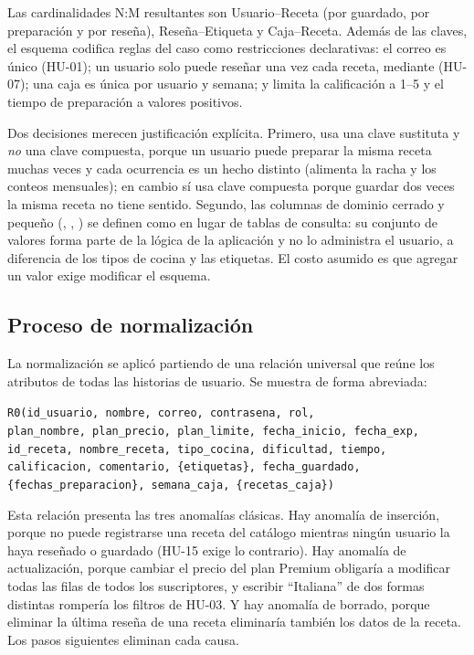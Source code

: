 Las cardinalidades N:M resultantes son Usuario--Receta (por guardado, por preparación y por reseña), Reseña--Etiqueta y Caja--Receta. Además de las claves, el esquema codifica reglas del caso como restricciones declarativas: el correo es único (HU-01); un usuario solo puede reseñar una vez cada receta, mediante  (HU-07); una caja es única por usuario y semana; y  limita la calificación a 1--5 y el tiempo de preparación a valores positivos.

Dos decisiones merecen justificación explícita. Primero,  usa una clave sustituta y \emph{no} una clave compuesta, porque un usuario puede preparar la misma receta muchas veces y cada ocurrencia es un hecho distinto (alimenta la racha y los conteos mensuales); en cambio  sí usa clave compuesta porque guardar dos veces la misma receta no tiene sentido. Segundo, las columnas de dominio cerrado y pequeño (, , ) se definen como  en lugar de tablas de consulta: su conjunto de valores forma parte de la lógica de la aplicación y no lo administra el usuario, a diferencia de los tipos de cocina y las etiquetas. El costo asumido es que agregar un valor exige modificar el esquema.

\subsection{Proceso de normalización}
La normalización se aplicó partiendo de una relación universal que reúne los atributos de todas las historias de usuario. Se muestra de forma abreviada:

\vspace{2pt}
\noindent\footnotesize\texttt{R0(id\_usuario, nombre, correo, contrasena, rol,\\
\hspace*{1.5em}plan\_nombre, plan\_precio, plan\_limite, fecha\_inicio, fecha\_exp,\\
\hspace*{1.5em}id\_receta, nombre\_receta, tipo\_cocina, dificultad, tiempo,\\
\hspace*{1.5em}calificacion, comentario, \{etiquetas\}, fecha\_guardado,\\
\hspace*{1.5em}\{fechas\_preparacion\}, semana\_caja, \{recetas\_caja\})}
\normalsize
\vspace{2pt}

Esta relación presenta las tres anomalías clásicas. Hay anomalía de inserción, porque no puede registrarse una receta del catálogo mientras ningún usuario la haya reseñado o guardado (HU-15 exige lo contrario). Hay anomalía de actualización, porque cambiar el precio del plan Premium obligaría a modificar todas las filas de todos los suscriptores, y escribir ``Italiana'' de dos formas distintas rompería los filtros de HU-03. Y hay anomalía de borrado, porque eliminar la última reseña de una receta eliminaría también los datos de la receta. Los pasos siguientes eliminan cada causa.

